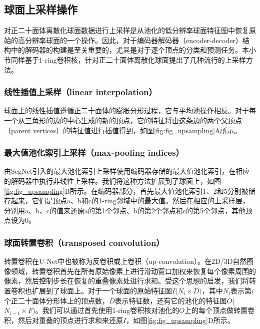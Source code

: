 \subsection{球面上采样操作}
对正二十面体离散化球面数据进行上采样是从池化的低分辨率球面特征图中恢复原始的高分辨率球面的一个操作。因此，对于编码器解码器（encoder-decoder）结构\cite{badrinarayanan2017segnet}中的解码器的构建是至关重要的，尤其是对于逐个顶点的分类和预测任务。本小节同样基于1-ring卷积核，针对正二十面体离散化球面提出了几种流行的上采样方法。

\subsubsection{线性插值上采样（linear interpolation）}
球面上的线性插值遵循正二十面体的膨胀分形过程，它与平均池操作相反。对于每一个从三角形的边的中心生成的新的顶点，它的特征将由这条边的两个父顶点（parent vertices）的特征值进行插值得到，如图\ref{fig:fig_upsampling}A所示。

\subsubsection{最大值池化索引上采样（max-pooling indices）}
由SegNet\cite{badrinarayanan2017segnet}引入的最大池化索引上采样使用编码器存储的最大值池化索引，在相应的解码器中执行非线性上采样。我们将这种方法扩展到了球面上，如图\ref{fig:fig_upsampling}B所示。在编码器部分，首先最大值池化索引1、2和5分别被储存起来，它们是顶点a、b和c的1-ring邻域中的最大值。然后在相应的上采样层，分别用a、b、c的值来还原a的第1个邻点、b的第2个邻点和c的第5个邻点，其他顶点设为0。

\subsubsection{球面转置卷积（transposed convolution）}
转置卷积在U-Net中也被称为反卷积或上卷积（up-convolution）\cite{ronneberger2015u}。在2D/3D自然图像领域，转置卷积首先在所有原始像素上进行滑动窗口加权来恢复每个像素周围的像素，然后控制步长在恢复的重叠像素处进行求和。受这个思想的启发，我们将转置卷积也扩展到了球面上。对于一个球面的原始特征图$I$($N_i\times D)$，其中$N_i$表示第$i$个正二十面体分形体上的顶点数，$D$表示特征数，还有它的池化的特征图$O$($N_{i-1}\times F)$。我们可以通过首先使用1-ring卷积核对池化的$O$上的每个顶点做转置卷积，然后对重叠的顶点进行求和来还原$I$，如图\ref{fig:fig_upsampling}D所示。

